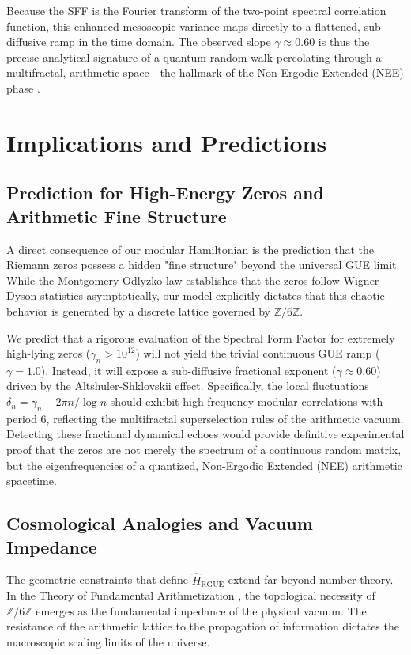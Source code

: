 \documentclass[aps,prl,preprint,superscriptaddress,floatfix]{revtex4-2}
\newcommand{\Zmod}{\mathbb{Z}/6\mathbb{Z}}
\begin{document}
Because the SFF is the Fourier transform of the two-point spectral correlation function, this enhanced mesoscopic variance maps directly to a flattened, sub-diffusive ramp in the time domain. The observed slope $\gamma \approx 0.60$ is thus the precise analytical signature of a quantum random walk percolating through a multifractal, arithmetic space—the hallmark of the Non-Ergodic Extended (NEE) phase \cite{Kravtsov2015, Khaymovich2020}.

\section{Implications and Predictions}

\subsection{Prediction for High-Energy Zeros and Arithmetic Fine Structure}

A direct consequence of our modular Hamiltonian is the prediction that the Riemann zeros possess a hidden "fine structure" beyond the universal GUE limit. While the Montgomery-Odlyzko law establishes that the zeros follow Wigner-Dyson statistics asymptotically, our model explicitly dictates that this chaotic behavior is generated by a discrete lattice governed by $\Zmod$.

We predict that a rigorous evaluation of the Spectral Form Factor for extremely high-lying zeros ($\gamma_n > 10^{12}$) will not yield the trivial continuous GUE ramp ($\gamma = 1.0$). Instead, it will expose a sub-diffusive fractional exponent ($\gamma \approx 0.60$) driven by the Altshuler-Shklovskii effect. Specifically, the local fluctuations $\delta_n = \gamma_n - 2\pi n/\log n$ should exhibit high-frequency modular correlations with period 6, reflecting the multifractal superselection rules of the arithmetic vacuum. Detecting these fractional dynamical echoes would provide definitive experimental proof that the zeros are not merely the spectrum of a continuous random matrix, but the eigenfrequencies of a quantized, Non-Ergodic Extended (NEE) arithmetic spacetime.

\subsection{Cosmological Analogies and Vacuum Impedance}

The geometric constraints that define $\hat{H}_{\text{RGUE}}$ extend far beyond number theory. In the Theory of Fundamental Arithmetization \cite{PeinadorGenesis}, the topological necessity of $\Zmod$ emerges as the fundamental impedance of the physical vacuum. The resistance of the arithmetic lattice to the propagation of information dictates the macroscopic scaling limits of the universe.
\end{document}
